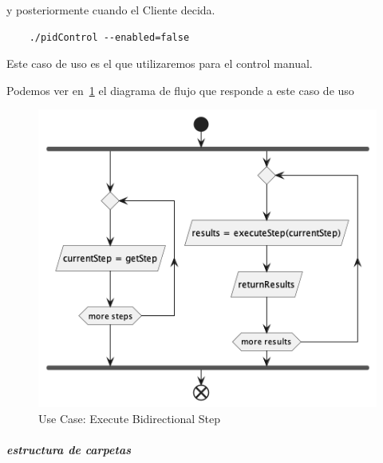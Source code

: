 y posteriormente cuando el Cliente decida.

\begin{verbatim}
    ./pidControl --enabled=false
\end{verbatim}

Este caso de uso es el que utilizaremos para el control manual.

Podemos ver en~\cref{fig:Use Case-Execute Bidirectional Step} el diagrama de flujo que responde a este caso de uso

\begin{figure}[H]
    \centering
    \includegraphics[height=0.2\textheight]{./part/Proyecto_ejecutivo/memoria_descriptiva/descripcionDelProyecto/client/uml/executeBidiStep}
    \caption{Use Case: Execute Bidirectional Step}\label{fig:Use Case-Execute Bidirectional Step}
\end{figure}

\subparagraph{estructura de carpetas}







